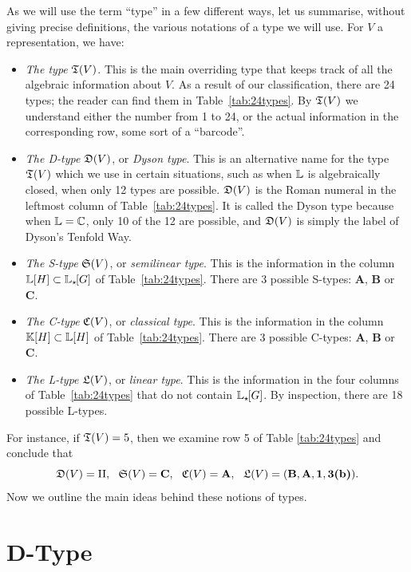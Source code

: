 As we will use the term ``type'' in a few different ways, let us summarise, without giving precise definitions, the various notations of a type we will use. For $V$ a representation, we have:
\begin{itemize}
\item {\em The type} ${\mathfrak T}(V)$. This is the main overriding type that keeps track of all the algebraic information about $V$.
As a result of our classification, there are 24 types; the reader can find them in Table~\ref{tab:24types}.
By ${\mathfrak T}(V)$ we understand either the number from 1 to 24, or the actual information in the corresponding row, some sort of a ``barcode''.
\item {\em The D-type} ${\mathfrak D}(V)$, or {\em Dyson type}. 
This is an alternative name for the type ${\mathfrak T}(V)$ which we use in certain situations, such as when ${\mathbb L}$ is algebraically closed, when only 12 types are possible.
${\mathfrak D}(V)$ is the Roman numeral in the leftmost column of Table~\ref{tab:24types}.
It is called the Dyson type because when ${\mathbb L} = {\mathbb C}$, only 10 of the 12 are possible, and ${\mathfrak D}(V)$ is simply the label of Dyson's Tenfold Way.
\item {\em The S-type} ${\mathfrak S}(V)$, or {\em semilinear type}.
This is the information in the column ${\mathbb L}[H] \subset {\mathbb L}_{\star \hspace{-0.1em}}[G]$ of Table~\ref{tab:24types}.
There are 3 possible S-types: \textbf{A}, \textbf{B} or \textbf{C}.
\item {\em The C-type} ${\mathfrak C}(V)$, or {\em classical type}.
This is the information in the column ${\mathbb K}[H] \subset {\mathbb L}[H]$ of Table~\ref{tab:24types}.
There are 3 possible C-types: \textbf{A}, \textbf{B} or \textbf{C}.
\item {\em The L-type} ${\mathfrak L}(V)$, or {\em linear type}.
  This is the information in the four columns
of Table~\ref{tab:24types}
that do not contain  ${\mathbb L}_{\star \hspace{-0.1em}}[G]$. By inspection,  
there are 18 possible L-types.
\end{itemize}  
For instance, if ${\mathfrak T}(V)=5$, then we examine row 5 of Table \ref{tab:24types} and conclude that
\[ \fD(V) = \mbox{II}, \ \ \fS(V) = \textbf{C}, \ \ \fC(V) = \textbf{A}, \ \ \fL(V) =( \textbf{B},\textbf{A},\textbf{1},\textbf{3(b)}).\]
Now we outline the main ideas behind these notions of types.

\section*{D-Type}

